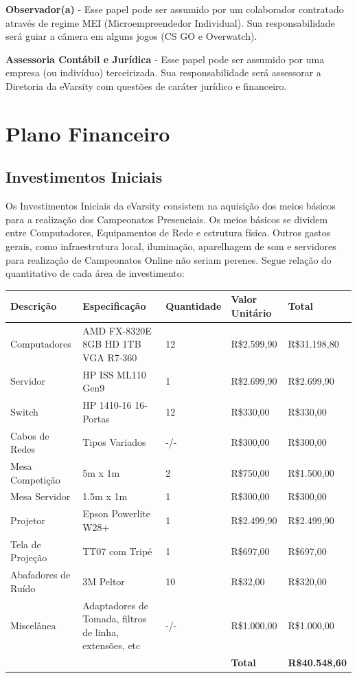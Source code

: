 \documentclass[a4paper, 12pt]{paper}
\begin{document}
\textbf{Observador(a)} -  Esse papel pode ser assumido por um colaborador contratado através de regime MEI (Microempreendedor Individual). Sua responsabilidade será guiar a câmera em alguns jogos (CS GO e Overwatch).

\textbf{Assessoria Contábil e Jurídica} - Esse papel pode ser assumido por uma empresa (ou indivíduo) terceirizada. Sua responsabilidade será assessorar a Diretoria da eVarsity com questões de caráter jurídico e financeiro.

\newpage
\section{Plano Financeiro}
\subsection{Investimentos Iniciais}
Os Investimentos Iniciais da eVarsity consistem na aquisição dos meios básicos para a realização dos Campeonatos Presenciais. Os meios básicos se dividem entre Computadores, Equipamentos de Rede e estrutura física. Outros gastos gerais, como infraestrutura local, iluminação, aparelhagem de som e servidores para realização de Campeonatos Online não seriam perenes. Segue relação do quantitativo de cada área de investimento:
\begin{table}[ht]
	\centering
	\begin{tabular}{p{3.5cm}p{4.3cm}p{2cm}p{2cm}p{2.5cm}}
		\hline
		\cellcolor{gray}Descrição&\cellcolor{gray}Especificação&\cellcolor{gray}Quantidade&\cellcolor{gray}Valor Unitário&\cellcolor{gray}Total \\
		\hline
		Computadores&AMD FX-8320E 8GB HD 1TB VGA R7-360&12&R\$2.599,90&R\$31.198,80\\
		Servidor&HP ISS ML110 Gen9&1&R\$2.699,90&R\$2.699,90\\
		Switch&HP 1410-16 16-Portas&12&R\$330,00&R\$330,00\\
		Cabos de Redes&Tipos Variados&-/-&R\$300,00&R\$300,00\\
		Mesa Competição&5m x 1m&2&R\$750,00&R\$1.500,00\\
		Mesa Servidor&1.5m x 1m&1&R\$300,00&R\$300,00\\		
		Projetor&Epson Powerlite W28+&1&R\$2.499,90&R\$2.499,90\\		
		Tela de Projeção&TT07 com Tripé&1&R\$697,00&R\$697,00\\	
		Abafadores de Ruído&3M Peltor&10&R\$32,00&R\$320,00\\			
		Miscelânea&Adaptadores de Tomada, filtros de linha, extensões, etc&-/-&R\$1.000,00&R\$1.000,00\\			
		\hline
		&&&\textbf{Total}&\textbf{R\$40.548,60}\\
		\hline
	\end{tabular}
\end{table}
\end{document}
